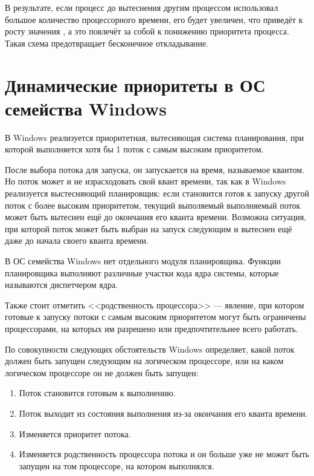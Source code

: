 В результате, если процесс до вытеснения другим процессом использовал большое 
количество процессорного времени, его  будет увеличен, что приведёт к 
росту значения , а это повлечёт за собой к понижению приоритета 
процесса. Такая схема предотвращает бесконечное откладывание.

\section{Динамические приоритеты в ОС семейства Windows}

В Windows реализуется приоритетная, вытесняющая система планирования, 
при которой выполняется хотя бы 1 поток с самым высоким приоритетом.

После выбора потока для запуска, он запускается на время, называемое квантом.
Но поток может и не израсходовать свой квант времени, так как в Windows 
реализуется выстесняющий планировщик: если становится готов к запуску другой поток
с более высоким приоритетом, текущий выполяемый выполняемый поток может быть 
вытеснен ещё до окончания его кванта времени. Возможна ситуация, при которой 
поток может быть выбран на запуск
следующим и вытеснен ещё даже до начала своего кванта времени.

В ОС семейства Windows нет отдельного модуля планировщика. 
Функции планировщика выполняют различные участки кода ядра системы, 
которые называются диспетчером ядра.

Также стоит отметить <<родственность процессора>> --- явление, 
при котором готовые к запуску потоки с самым
высоким приоритетом могут быть ограничены
процессорами, на которых
им разрешено или предпочтительнее всего работать.

По совокупности следующих обстоятельств Windows определяет,
какой поток должен быть запущен следующим на логическом процессоре, или 
на каком логическом процессоре он не должен быть запущен:

\begin{enumerate}
  \item Поток становится готовым к выполнению.
  \item Поток выходит из состояния выполнения из-за окончания его кванта времени.
  \item Изменяется приоритет потока.
  \item Изменяется родственность процессора потока и он больше уже не может 
  быть запущен на том процессоре, на котором выполнялся.
\end{enumerate}

